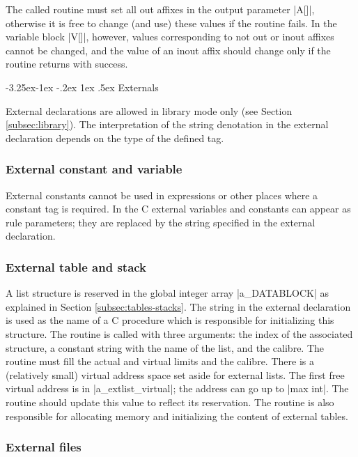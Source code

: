 \documentclass{article}
\makeatletter
\newcommand\g[1]{\textsf{#1}}
\renewcommand\subsection{%
\@startsection{subsection}{2}{\z@}%
   {-3.25ex\@plus -1ex \@minus -.2ex}%
   {1ex \@plus .5ex}%
   {\normalfont\normalsize\bfseries}}
\makeatother
\begin{document}
\smallskip
\noindent
The called routine must set all out affixes in the output parameter
\pp|A[]|, otherwise it is free to change (and use) these values
if the routine fails. In the variable block \pp|V[]|, however,
values corresponding to not out or inout affixes
cannot be changed, and the value 
of an inout affix should change only if the routine returns with success.

\subsection{Externals}\label{subsec:externals}

External declarations are allowed in library mode only (see Section
\ref{subsec:library}). The interpretation of the \g{string denotation} in the 
external declaration depends on the type of the defined tag.

\subsubsection{External constant and variable}

External constants cannot be used in expressions or other places where a 
constant tag is required. In the {\sf C} external variables and constants 
can appear as rule parameters; they are replaced by the string specified in 
the \g{external declaration}.

\subsubsection{External table and stack}

A list structure is reserved in the global integer array \pp|a\_DATABLOCK|
as explained in Section \ref{subsec:tables-stacks}. The string in the
external declaration is used as the name of a {\sf C} procedure which is
responsible for initializing this structure. The routine is called with
three arguments: the index of the associated structure, a constant string
with the name of the list, and the calibre.
The routine must fill the actual and virtual limits and the calibre.
There is a (relatively small) virtual address space set aside for external
lists. The first free virtual address is in \pp|a\_extlist\_virtual|; the
address can go up to \pp|max int|. The routine should update this value to
reflect its reservation. The routine is also responsible for allocating memory
and initializing the content of external tables.

\subsubsection{External files}
\end{document}
